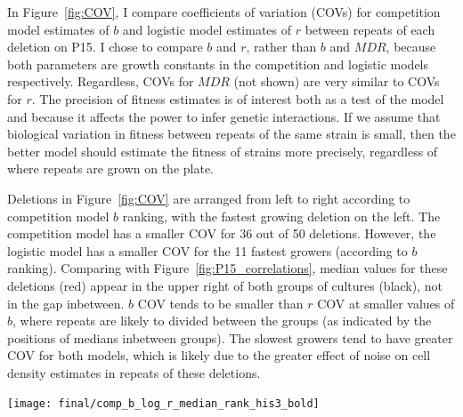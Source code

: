 \begin{multicols}{2}
In Figure~\ref{fig:COV}, I compare coefficients of variation (COVs)
for competition model estimates of \(b\) and logistic model estimates
of \(r\) between repeats of each deletion on P15. I chose to compare
\(b\) and \(r\), rather than \(b\) and \(MDR\), because both
parameters are growth constants in the competition and logistic models
respectively. Regardless, COVs for \(MDR\) (not shown) are very
similar to COVs for \(r\). The precision of fitness estimates is of
interest both as a test of the model and because it affects the power
to infer genetic interactions. If we assume that biological variation
in fitness between repeats of the same strain is small, then the
better model should estimate the fitness of strains more precisely,
regardless of where repeats are grown on the plate.

Deletions in Figure~\ref{fig:COV} are arranged from left to right
according to competition model \(b\) ranking, with the fastest growing
deletion on the left. The competition model has a smaller COV for 36
out of 50 deletions. However, the logistic model has a smaller COV for
the 11 fastest growers (according to \(b\) ranking). Comparing with
Figure~\ref{fig:P15_correlations}, median values for these deletions
(red) appear in the upper right of both groups of cultures (black),
not in the gap inbetween. \(b\) COV tends to be smaller than \(r\) COV
at smaller values of \(b\), where repeats are likely to divided
between the groups (as indicated by the positions of medians inbetween
groups). The slowest growers tend to have greater COV for both models,
which is likely due to the greater effect of noise on cell density
estimates in repeats of these deletions.

\end{multicols}
\graphicspath{{images/COV/}}
\begin{Figure}
  \centering
  \texttt{[image: final/comp\_b\_log\_r\_median\_rank\_his3\_bold]}
  \label{fig:COV}
\end{Figure}
\begin{multicols}{2}


\end{multicols}

